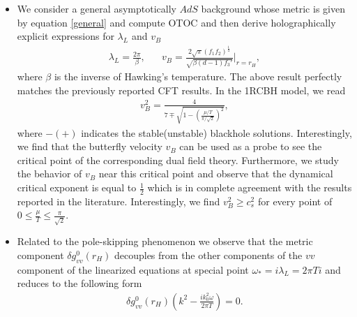 \documentclass[preprintnumbers,aps,prd,longbibliography,nofootinbib,nobibnotes,amsmath,amssymb]{revtex4}
\begin{document}
\begin{itemize}
\item We consider a general asymptotically $AdS$ background  whose metric is given by equation \eqref{general}
and  compute OTOC and then derive holographically  explicit expressions for $ \lambda_{L}$ and $v_B$ 
 \begin{align}
 \lambda_{L}=\frac{2\pi}{\beta},\,\,\,\,\,\,\,\,\,\,v_B=\frac{2\sqrt{\pi}(f_1f_2)^{\frac{1}{4}}}{\sqrt{\beta (d-1)f_3'}}\bigg\vert_{r=r_H},
 \end{align}
 where $\beta$ is the inverse of Hawking's temperature. The above result perfectly matches the previously reported  CFT results.  In the 1RCBH model, we read 
 \begin{align}
 v_B^2=\frac{4}{7\mp \sqrt{1-\left(\frac{\mu /T}{\pi /\sqrt{2}}\right)^2}},
 \end{align}
 where $-(+)$ indicates the stable(unstable) blackhole solutions. Interestingly, we find that the butterfly velocity $v_B$ can be used as a probe to see the critical point of the corresponding dual field theory. Furthermore, we  study the behavior of $v_B$ near this critical point and observe that the dynamical critical exponent is equal to $\frac{1}{2}$ which is in complete agreement with the results reported in the literature. Interestingly, we find $v_B^2 \geq c_s^2$ for every point of $0 \leq \frac{\mu}{T} \leq \frac{\pi}{\sqrt{2}}$.
 \item Related to the pole-skipping phenomenon we observe that the metric component $\delta g_{v v}^{0}(r_H)$ decouples from the other components of the $vv$ component of the linearized equations  at special point   $\omega_{*}=i\lambda_{L}=2 \pi Ti$ and reduces to the following form
 \begin{align}
	\delta g_{v v}^{0}(r_H) \left( k^2 - \frac{i k_{0}^2 \omega}{2 \pi T} \right) = 0.
\end{align}

\end{itemize}
\end{document}
